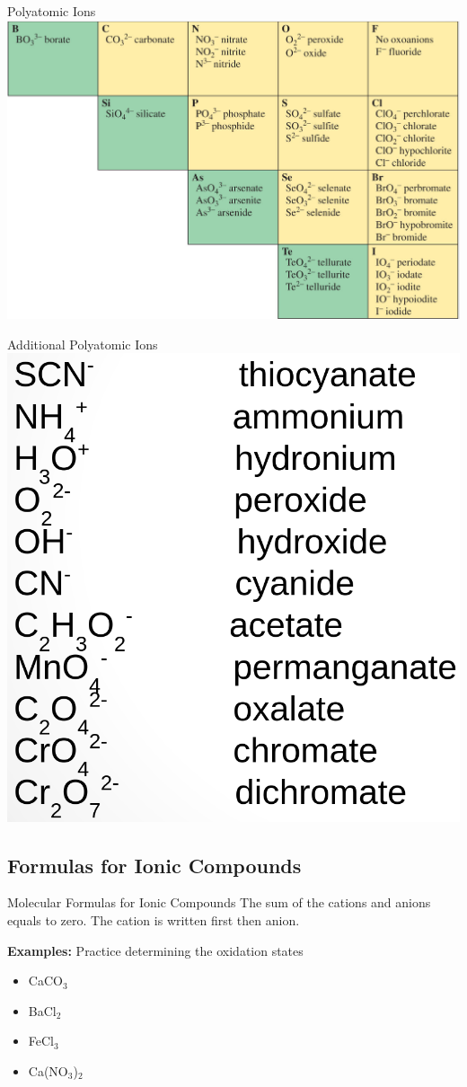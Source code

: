 \documentclass[11pt]{beamer}
\begin{document}
\begin{frame}{Polyatomic Ions}
  \centering
  \includegraphics[width=\linewidth]{polyatomic_ion}
\end{frame}

\begin{frame}{Additional Polyatomic Ions}
  \centering
  \includegraphics[width=0.7\linewidth]{more_poly_ions}
\end{frame}

\subsection{Formulas for Ionic Compounds}

\begin{frame}{Molecular Formulas for Ionic Compounds}
  The sum of the cations and anions equals to zero. The
  cation is written first then anion.

  \textbf{Examples:} Practice determining the oxidation states
  \begin{itemize}
  \item CaCO$_3$
  \item BaCl$_2$
  \item FeCl$_3$
  \item Ca(NO$_3$)$_2$
  \end{itemize}
\end{frame}
\end{document}
